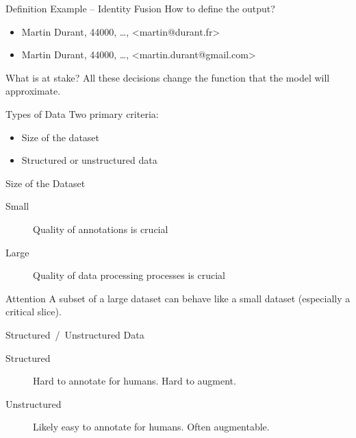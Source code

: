 \begin{frame}{Definition Example – Identity Fusion}
  How to define the output?
  \begin{itemize}
    \item Martin Durant, 44000, …, <martin@durant.fr>
    \item Martin Durant, 44000, …, <martin.durant@gmail.com>
  \end{itemize}
\end{frame}

\begin{frame}{What is at stake?}
  All these decisions change the function that the model will approximate.
\end{frame}

\begin{frame}{Types of Data}
  Two primary criteria:
  \begin{itemize}
    \item Size of the dataset
    \item Structured or unstructured data
  \end{itemize}
\end{frame}

\begin{frame}{Size of the Dataset}
  \begin{description}
    \item[Small] Quality of annotations is crucial
    \item[Large] Quality of data processing processes is crucial
  \end{description}

  \begin{block}{Attention}
    A subset of a large dataset can behave like a small dataset (especially a critical slice).
  \end{block}
\end{frame}

\begin{frame}{Structured~/~Unstructured Data}
  \begin{description}
    \item[Structured] Hard to annotate for humans. Hard to augment.
    \item[Unstructured] Likely easy to annotate for humans. Often augmentable.
  \end{description}
\end{frame}

